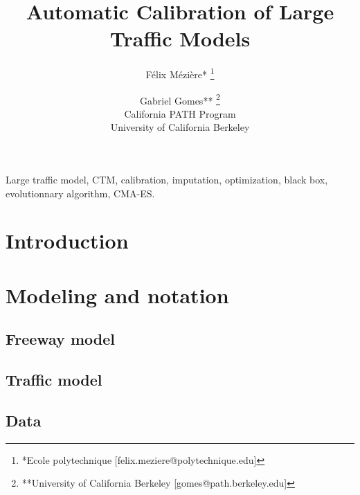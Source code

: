  

\usepackage{morefloats}
\usepackage[utf8]{inputenc} 
\usepackage[T1]{fontenc}
\usepackage{lmodern}
\usepackage{graphicx}
\usepackage{units}
\usepackage{amsmath}
\usepackage{array}
\usepackage{textcomp}
\usepackage{multirow}
\usepackage{afterpage,natbib,lipsum}






\title{Automatic Calibration of Large Traffic Models}

\author{Félix Mézière* \thanks{*Ecole polytechnique [felix.meziere@polytechnique.edu]} \and Gabriel Gomes** \thanks{**University of California Berkeley [gomes@path.berkeley.edu]} \\California PATH Program \\ University of California Berkeley} 

\maketitle

\begin{abstract}

\end{abstract}

\begin{IEEEkeywords}
Large traffic model, CTM, calibration, imputation, optimization, black box, evolutionnary algorithm, CMA-ES.
\end{IEEEkeywords}

\IEEEpeerreviewmaketitle

\section*{Introduction}


\section{Modeling and notation}
\subsection{Freeway model}
\label{subsec:freeway_model}

\subsection{Traffic model}
\label{subsec:traffic_model}

\subsection{Data}
\label{subsec:data}

